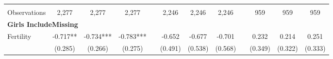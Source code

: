 \begin{landscape}
\begin{table}[htpb!]
\begin{center}
\begin{tabular}{lcccp{2mm}cccp{2mm}ccc}
\begin{footnotesize}\end{footnotesize}&\begin{footnotesize}\end{footnotesize}&\begin{footnotesize}\end{footnotesize}&\begin{footnotesize}\end{footnotesize}&\begin{footnotesize}\end{footnotesize}&\begin{footnotesize}\end{footnotesize}&\begin{footnotesize}\end{footnotesize}&\begin{footnotesize}\end{footnotesize}&\begin{footnotesize}\end{footnotesize}&\begin{footnotesize}\end{footnotesize}&\begin{footnotesize}\end{footnotesize}&\begin{footnotesize}\end{footnotesize}\\Observations&2,277&2,277&2,277&&2,246&2,246&2,246&&959&959&959\\
\multicolumn{12}{l}{\textbf{Girls IncludeMissing}}\\ 
Fertility&-0.717**&-0.734***&-0.783***&&-0.652&-0.677&-0.701&&0.232&0.214&0.251\\
&(0.285)&(0.266)&(0.275)&&(0.491)&(0.538)&(0.568)&&(0.349)&(0.322)&(0.333)\\

\end{tabular}
\end{center}
\end{table}
\end{landscape}
